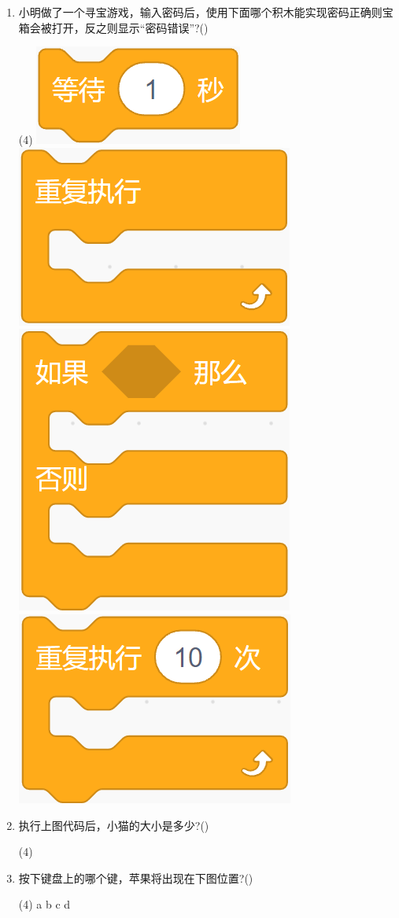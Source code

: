 \documentclass[10pt, a4paper]{article}
\begin{document}
\begin{enumerate}
        \item 小明做了一个寻宝游戏，输入密码后，使用下面哪个积木能实现密码正确则宝箱会被打开，反之则显示“密码错误”?(\qquad)
        \begin{tasks}(4)
            \task \includegraphics[width=.15\textwidth]{22a.png}
            \task \includegraphics[width=.15\textwidth]{22b.png}
            \task \includegraphics[width=.1\textwidth]{22c.png}
            \task \includegraphics[width=.15\textwidth]{22d.png}
        \end{tasks}

        \item  执行上图代码后，小猫的大小是多少?(\qquad)
        \begin{tasks}(4)
        \end{tasks}

        \newpage
        \item 按下键盘上的哪个键，苹果将出现在下图位置?(\qquad)
        \begin{tasks}(4)
            \task a
            \task b
            \task c
            \task d
        \end{tasks}


\end{enumerate}
\end{document}
